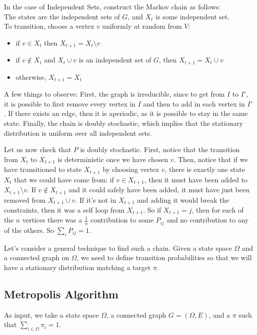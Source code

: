 In the case of Independent Sets, construct the Markov chain as follows:\\
  The states are the independent sets of $G$, and $X_t$ is some independent set.\\
  To transition, choose a vertex $v$ uniformly at random from $V$:
\begin{itemize}
\item if $v \in X_t$ then $X_{t+1} = X_t \setminus v$
\item if $v \notin X_t$ and $X_t \cup v$ is an independent set of $G$, then $X_{t+1} = X_t \cup v$
\item otherwise, $X_{t+1} = X_t$
\end{itemize}

A few things to observe: First, the graph is irreducible, since to get from $I$ to $I'$, it is possible to first remove every vertex in $I$ and then to add in each vertex in $I'$. If there exists an edge, then it is aperiodic, as it is possible to stay in the same state. Finally, the chain is doubly stochastic, which implies that the stationary distribution is uniform over all independent sets.

Let us now check that $P$ is doubly stochastic. First, notice that the transition from $X_t$ to $X_{t+1}$ is deterministic once we have chosen $v$. Then, notice that if we have transitioned to state $X_{t+1}$ by choosing vertex $v$, there is exactly one state $X_t$ that we could have come from: if $v \in X_{t+1}$, then it must have been added to $X_{t+1} \setminus v$. If $v \notin X_{t+1}$ and it could safely have been added, it must have just been removed from $X_{t+1} \cup v$. If it's not in $X_{t+1}$ and adding it would break the constraints, then it was a self loop from $X_{t+1}$. So if $X_{t+1} = j$, then for each of the $n$ vertices there was a $\frac{1}{n}$ contribution to some $P_{ij}$ and no contribution to any of the others. So $\sum_i P_{ij} = 1$.

\bigskip

Let's consider a general technique to find such a chain. Given a state space $\Omega$ and a connected graph on $\Omega$, we need to define transition probabilities so that we will have a stationary distribution matching a target $\pi$.

\subsection{Metropolis Algorithm}
As input, we take a state space $\Omega$, a connected graph $G = (\Omega, E)$, and a $\pi$ such that $\sum_{i \in \Omega} \pi_i = 1$.

